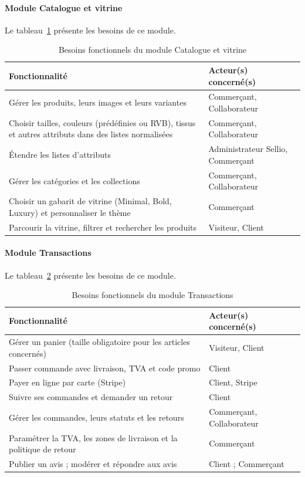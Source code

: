 \paragraph{Module Catalogue et vitrine}
Le tableau~\ref{tab:besoins-catalogue} présente les besoins de ce module.
\begin{table}[H]
\centering
\renewcommand{\arraystretch}{1.3}
\begin{tabular}{|p{9.5cm}|p{5.5cm}|}
\hline
\textbf{Fonctionnalité} & \textbf{Acteur(s) concerné(s)} \\
\hline
Gérer les produits, leurs images et leurs variantes & Commerçant, Collaborateur \\
\hline
Choisir tailles, couleurs (prédéfinies ou RVB), tissus et autres attributs dans des listes normalisées & Commerçant, Collaborateur \\
\hline
Étendre les listes d'attributs & Administrateur Sellio, Commerçant \\
\hline
Gérer les catégories et les collections & Commerçant, Collaborateur \\
\hline
Choisir un gabarit de vitrine (Minimal, Bold, Luxury) et personnaliser le thème & Commerçant \\
\hline
Parcourir la vitrine, filtrer et rechercher les produits & Visiteur, Client \\
\hline
\end{tabular}
\caption{Besoins fonctionnels du module Catalogue et vitrine}
\label{tab:besoins-catalogue}
\end{table}

\paragraph{Module Transactions}
Le tableau~\ref{tab:besoins-transactions} présente les besoins de ce module.
\begin{table}[H]
\centering
\renewcommand{\arraystretch}{1.3}
\begin{tabular}{|p{9.5cm}|p{5.5cm}|}
\hline
\textbf{Fonctionnalité} & \textbf{Acteur(s) concerné(s)} \\
\hline
Gérer un panier (taille obligatoire pour les articles concernés) & Visiteur, Client \\
\hline
Passer commande avec livraison, TVA et code promo & Client \\
\hline
Payer en ligne par carte (Stripe) & Client, Stripe \\
\hline
Suivre ses commandes et demander un retour & Client \\
\hline
Gérer les commandes, leurs statuts et les retours & Commerçant, Collaborateur \\
\hline
Paramétrer la TVA, les zones de livraison et la politique de retour & Commerçant \\
\hline
Publier un avis ; modérer et répondre aux avis & Client ; Commerçant \\
\hline
\end{tabular}
\caption{Besoins fonctionnels du module Transactions}
\label{tab:besoins-transactions}
\end{table}

